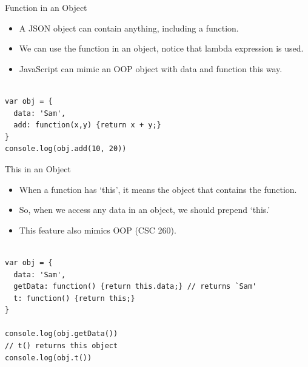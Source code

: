 \begin{frame}[fragile]{Function in an Object}

\begin{itemize}
	\item A JSON object can contain anything, including a function.
	\item We can use the function in an object, notice that lambda expression is used.
	\item JavaScript can mimic an OOP object with data and function this way. 
\end{itemize}

\begin{Code}{}%
\begin{lstlisting}[firstnumber=1, label=glabels, xleftmargin=0pt, basicstyle=\tiny]% 

var obj = {
  data: 'Sam',
  add: function(x,y) {return x + y;}
}
console.log(obj.add(10, 20)) 
\end{lstlisting}%
\end{Code}%
\end{frame}

\begin{frame}[fragile]{This in an Object}

\begin{itemize}
	\item When a function has `this', it means the object that contains the function. 
	\item So, when we access any data in an object, we should prepend `this.'
	\item This feature also mimics OOP (CSC 260). 
\end{itemize}

\begin{Code}{}%
\begin{lstlisting}[firstnumber=1, label=glabels, xleftmargin=0pt, basicstyle=\scriptsize]% 

var obj = {
  data: 'Sam',
  getData: function() {return this.data;} // returns `Sam'
  t: function() {return this;}
}

console.log(obj.getData())
// t() returns this object
console.log(obj.t())
\end{lstlisting}%
\end{Code}%

\end{frame}


